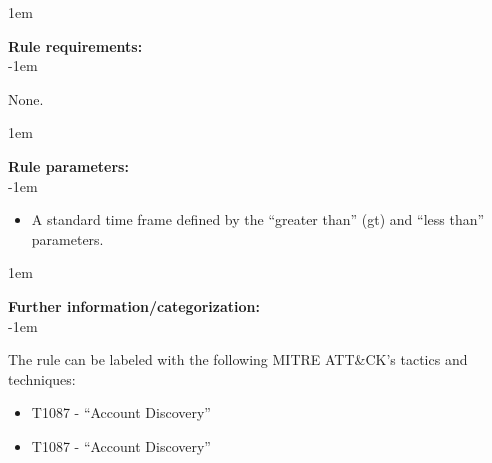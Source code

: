 \openup 1em

{\bf Rule requirements:} \\

\openup -1em
\vspace{-2em}

None.

\openup 1em

{\bf Rule parameters:} \\

\openup -1em
\vspace{-2em}

\begin{itemize}
	\item A standard time frame defined by the ``greater than'' (gt) and ``less than'' parameters.
\end{itemize}

\openup 1em

{\bf Further information/categorization:} \\

\openup -1em
\vspace{-2em}


The rule can be labeled with the following MITRE ATT\&CK's tactics and techniques:
\begin{itemize}
	\item T1087 - ``Account Discovery''
	\item T1087 - ``Account Discovery''
\end{itemize}

\pagebreak

